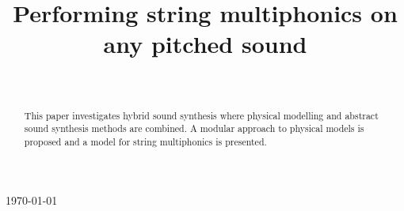 \documentclass{sigchi}
\def\plaintitle{Performing string multiphonics on any pitched sound}
\begin{document}
\title{\plaintitle}

\author{%
  \\
}

\maketitle


\today
\begin{abstract}
This paper investigates hybrid sound synthesis where physical modelling and abstract sound synthesis methods are combined. A modular approach to physical models is proposed and a model for string multiphonics is presented.
\end{abstract}



\end{document}
